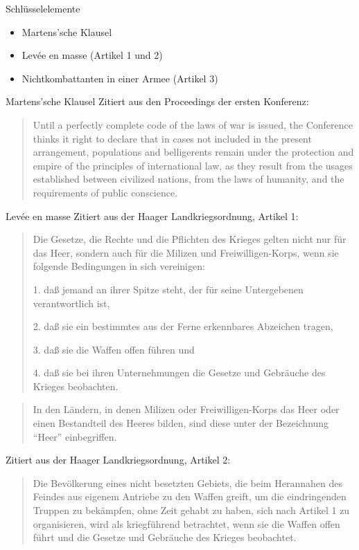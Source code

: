\documentclass{beamer}
\begin{document}
\begin{frame}{Schlüsselelemente}
    \begin{itemize}
        \item Martens'sche Klausel
        \item Levée en masse (Artikel 1 und 2)
        \item Nichtkombattanten in einer Armee (Artikel 3)
    \end{itemize}
\end{frame}
\begin{frame}{Martens'sche Klausel}
    Zitiert aus den Proceedings der ersten Konferenz\cite{Scott1920}:
    \begin{quotation}
      Until a perfectly complete code of the laws of war is issued, the Conference thinks it right to declare that in cases not included in the present arrangement, populations and belligerents remain under the protection and empire of the principles of international law, as they result from the usages established between civilized nations, from the laws of humanity, and the requirements of public conscience.
    \end{quotation}
\end{frame}
\begin{frame}[allowframebreaks]{Levée en masse}
    Zitiert aus der Haager Landkriegsordnung, Artikel 1\cite{DeutschesReich2010}:
    \begin{quotation}
      Die Gesetze, die Rechte und die Pflichten des Krieges gelten nicht nur für das Heer, sondern auch für die Milizen und Freiwilligen-Korps, wenn sie folgende Bedingungen in sich vereinigen:
      
1. daß jemand an ihrer Spitze steht, der für seine Untergebenen verantwortlich ist,

2. daß sie ein bestimmtes aus der Ferne erkennbares Abzeichen tragen,

3. daß sie die Waffen offen führen und

4. daß sie bei ihren Unternehmungen die Gesetze und Gebräuche des Krieges beobachten.
    \end{quotation}
    
    \begin{quotation}
        In den Ländern, in denen Milizen oder Freiwilligen-Korps das Heer oder einen Bestandteil des Heeres bilden, sind diese unter der Bezeichnung "`Heer"' einbegriffen.
    \end{quotation}
    
    Zitiert aus der Haager Landkriegsordnung, Artikel 2\cite{DeutschesReich2010}:
    \begin{quotation}
      Die Bevölkerung eines nicht besetzten Gebiets, die beim Herannahen des Feindes aus eigenem Antriebe zu den Waffen greift, um die eindringenden Truppen zu bekämpfen, ohne Zeit gehabt zu haben, sich nach Artikel 1 zu organisieren, wird als kriegführend betrachtet, wenn sie die Waffen offen führt und die Gesetze und Gebräuche des Krieges beobachtet.
    \end{quotation}
\end{frame}
\end{document}
